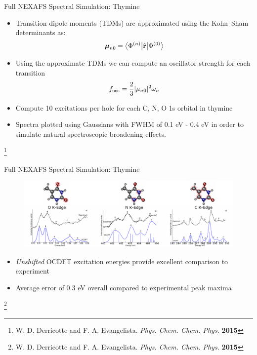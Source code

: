 \documentclass[t]{beamer}
\newcommand\blfootnote[1]{%
  \begingroup
  \renewcommand\thefootnote{}\footnote{#1}%
  \addtocounter{footnote}{-1}%
  \endgroup
}
\newcommand{\bra}[2][0]
{\ifthenelse{\equal{#1}{0}}{\left\langle #2 \right|}
{\ifthenelse{\equal{#1}{1}}{\big\langle #2 \big|}
{\ifthenelse{\equal{#1}{2}}{\Big\langle #2 \Big|}
{\ifthenelse{\equal{#1}{3}}{\bigg\langle #2 \bigg|}
{\ifthenelse{\equal{#1}{4}}{\Bigg\langle #2 \Bigg|}
{Error}}}}}
}
\newcommand{\ket}[2][0]
{\ifthenelse{\equal{#1}{0}}{\left| #2 \right\rangle}
{\ifthenelse{\equal{#1}{1}}{\big| #2 \big\rangle}
{\ifthenelse{\equal{#1}{2}}{\Big| #2 \Big\rangle}
{\ifthenelse{\equal{#1}{3}}{\bigg| #2 \bigg\rangle}
{\ifthenelse{\equal{#1}{4}}{\Bigg| #2 \Bigg\rangle}
{Error}}}}}
}
\begin{document}
\begin{frame}{Full NEXAFS Spectral Simulation: Thymine}
\begin{itemize}
\item Transition dipole moments (TDMs) are approximated using the Kohn--Sham determinants as:
\begin{equation}
\boldsymbol{\mu}_{n0} = \bra[1]{\Phi^{(n)}} \hat{\textbf{r}}\ket[1]{\Phi^{(0)}}
\end{equation}
\item Using the approximate TDMs we can compute an oscillator strength for each transition
\begin{equation}
f_{\rm osc} = \frac{2}{3} |\mu_{n0}|^2 \omega_{n}
\end{equation}
\item Compute 10 excitations per hole for each C, N, O 1s orbital in thymine
\item Spectra plotted using Gaussians with FWHM of 0.1 eV - 0.4 eV in order to simulate natural spectroscopic broadening effects.
\end{itemize}
\blfootnote{W. D. Derricotte and F. A. Evangelista. \textit{Phys. Chem. Chem. Phys.} \textbf{2015}}
\end{frame}

\begin{frame}{Full NEXAFS Spectral Simulation: Thymine}
\begin{figure}[!t]
\centering
\includegraphics[scale=0.65]{thymine_all_spec.pdf}
\end{figure}
\begin{itemize}
\item \textit{Unshifted} OCDFT excitation energies provide excellent comparison to experiment
\item Average error of 0.3 eV overall compared to experimental peak maxima
\end{itemize}
\blfootnote{W. D. Derricotte and F. A. Evangelista. \textit{Phys. Chem. Chem. Phys.} \textbf{2015}}
\end{frame}
\end{document}

